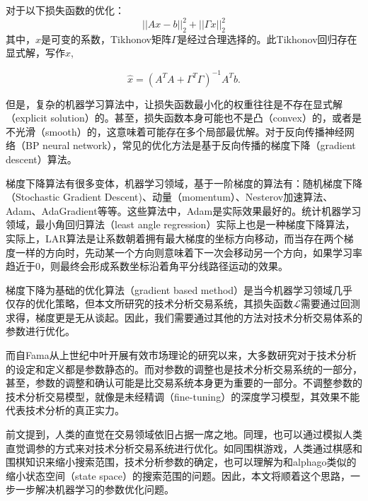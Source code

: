 \documentclass[twoside,longtitle]{LZUthesis}
\begin{document}
对于以下损失函数的优化：
\begin{equation}
||Ax-b||_2^2 + ||\Gamma x||_2^2
\end{equation}
其中，$x$是可变的系数，Tikhonov矩阵$\Gamma$是经过合理选择的。此Tikhonov回归存在显式解，写作$\hat{x}$,

\begin{equation}
\hat{x}=(A^{T}A+\Gamma^{T}\Gamma)^{-1}A^{T}b.
\end{equation}

但是，复杂的机器学习算法中，让损失函数最小化的权重往往是不存在显式解（explicit solution）的。甚至，损失函数本身可能也不是凸（convex）的，或者是不光滑（smooth）的，这意味着可能存在多个局部最优解。对于反向传播神经网络（BP neural network），常见的优化方法是基于反向传播的梯度下降（gradient descent）算法。

梯度下降算法有很多变体，机器学习领域，基于一阶梯度的算法有：随机梯度下降（Stochastic Gradient Descent)、动量（momentum）、Nesterov加速算法、Adam、AdaGradient等等。这些算法中，Adam是实际效果最好的\cite{Kingma2014Adam}\cite{Nesterov2017Efficiency}。统计机器学习领域，最小角回归算法（least angle regression）实际上也是一种梯度下降算法\cite{Tibshirani2004Least}，实际上，LAR算法是让系数朝着拥有最大梯度的坐标方向移动，而当存在两个梯度一样的方向时，先动某一个方向则意味着下一次会移动另一个方向，如果学习率趋近于0，则最终会形成系数坐标沿着角平分线路径运动的效果。

梯度下降为基础的优化算法（gradient based method）是当今机器学习领域几乎仅存的优化策略，但本文所研究的技术分析交易系统，其损失函数$\mathcal{L}$需要通过回测求得，梯度更是无从谈起。因此，我们需要通过其他的方法对技术分析交易体系的参数进行优化。

而自Fama\cite{Malkiel1970EFFICIENT}从上世纪中叶开展有效市场理论的研究以来，大多数研究对于技术分析的设定和定义都是参数静态的。而对参数的调整也是技术分析交易系统的一部分，甚至，参数的调整和确认可能是比交易系统本身更为重要的一部分。不调整参数的技术分析交易模型，就像是未经精调（fine-tuning）的深度学习模型，其效果不能代表技术分析的真正实力。

前文提到，人类的直觉在交易领域依旧占据一席之地。同理，也可以通过模拟人类直觉调参的方式来对技术分析交易系统进行优化。如同围棋游戏，人类通过棋感和围棋知识来缩小搜索范围，技术分析参数的确定，也可以理解为和alphago\cite{Silver2017Mastering}类似的缩小状态空间（state space）的搜索范围的问题。因此，本文将顺着这个思路，一步一步解决机器学习的参数优化问题。
\end{document}
